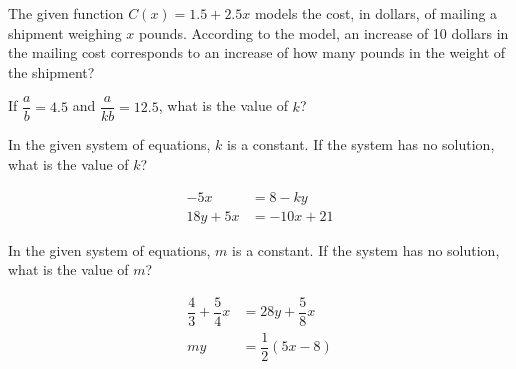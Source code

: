 \noindent\markforreview
\vspace{1em}

The given function $C(x) = 1.5 + 2.5x$ models the cost, in dollars, of mailing a shipment weighing $x$ pounds. According to the model, an increase of 10 dollars in the mailing cost corresponds to an increase of how many pounds in the weight of the shipment?

\vspace{0.75em}


\vspace{2em}

\noindent\markforreview
\vspace{1em}

If $\dfrac{a}{b} = 4.5$ and $\dfrac{a}{kb} = 12.5$, what is the value of $k$?

\vspace{2em}

\noindent\markforreview
\vspace{1em}

In the given system of equations, $k$ is a constant. If the system has no solution, what is the value of $k$?

\vspace{0.5em}

\[
\begin{aligned}
-5x &= 8 - ky \\
18y + 5x &= -10x + 21
\end{aligned}
\]

\vspace{2em}

\noindent\markforreview
\vspace{1em}

In the given system of equations, $m$ is a constant. If the system has no solution, what is the value of $m$?

\vspace{0.5em}

\[
\begin{aligned}
\dfrac{4}{3} + \dfrac{5}{4}x &= 28y + \dfrac{5}{8}x \\
my &= \dfrac{1}{2}(5x - 8)
\end{aligned}
\]

\vspace{2em}

\noindent\markforreview
\vspace{1em}


